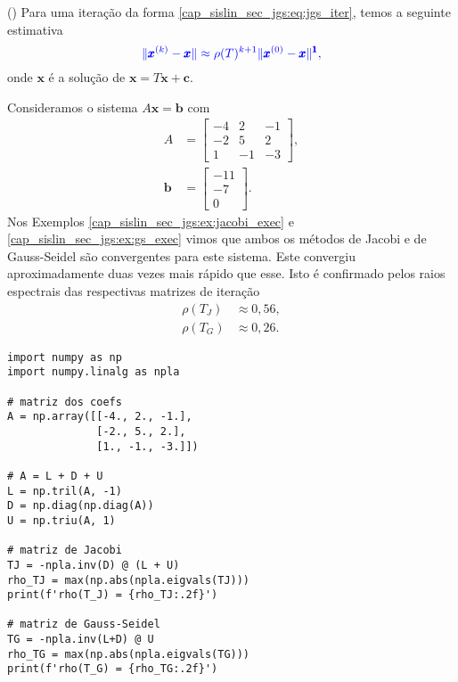 \begin{obs}()
  Para uma iteração da forma \eqref{cap_sislin_sec_jgs:eq:jgs_iter}, temos a seguinte estimativa
  \begin{equation}\color{blue}\|\pmb{x}^{(k)}-\pmb{x}\| \approx \rho(T)^{k+1}\|\pmb{x}^{(0)}-\pmb{x}\|^{\pmb{1}},
  \end{equation}
onde $\pmb{x}$ é a solução de $\pmb{x} = T\pmb{x} + \pmb{c}$.
\end{obs}

\begin{ex}
  Consideramos o sistema $A\pmb{x} = \pmb{b}$ com
  \begin{align}
    A &=
    \begin{bmatrix}
      -4 & 2 & -1 \\
      -2 & 5 & 2 \\
       1 & -1 & -3
    \end{bmatrix},\\
    \pmb{b} &=
    \begin{bmatrix}
      -11\\ -7\\ 0
    \end{bmatrix}.
  \end{align}
  Nos Exemplos \ref{cap_sislin_sec_jgs:ex:jacobi_exec} e \ref{cap_sislin_sec_jgs:ex:gs_exec} vimos que ambos os métodos de Jacobi e de Gauss-Seidel são convergentes para este sistema. Este convergiu aproximadamente duas vezes mais rápido que esse. Isto é confirmado pelos raios espectrais das respectivas matrizes de iteração
  \begin{align}
    \rho(T_J) &\approx 0,56,\\
    \rho(T_G) &\approx 0,26.
  \end{align}

\begin{lstlisting}
import numpy as np
import numpy.linalg as npla

# matriz dos coefs
A = np.array([[-4., 2., -1.],
              [-2., 5., 2.],
              [1., -1., -3.]])

# A = L + D + U
L = np.tril(A, -1)
D = np.diag(np.diag(A))
U = np.triu(A, 1)

# matriz de Jacobi
TJ = -npla.inv(D) @ (L + U)
rho_TJ = max(np.abs(npla.eigvals(TJ)))
print(f'rho(T_J) = {rho_TJ:.2f}')

# matriz de Gauss-Seidel
TG = -npla.inv(L+D) @ U
rho_TG = max(np.abs(npla.eigvals(TG)))
print(f'rho(T_G) = {rho_TG:.2f}')
\end{lstlisting}

\end{ex}

